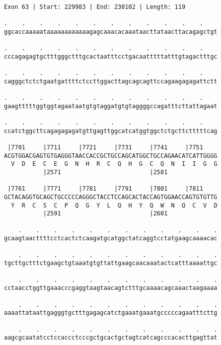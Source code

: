 \documentclass{article}
\begin{document}
\begin{Verbatim}[fontfamily=courier]
Exon 63 | Start: 229983 | End: 230102 | Length: 119

.    .    .    .    .    .    .    .    .    .    .    .    
ggcaccaaaaataaaaaaaaaaaagagcaaacacaaataacttataacttacagagctgt

.    .    .    .    .    .    .    .    .    .    .    .    
cccagagagtgctttgggctttgcactaatttcctgacaatttttatttgtagactttgc

.    .    .    .    .    .    .    .    .    .    .    .    
cagggctctctgaatgattttctccttggacttagcagcagttccagaagagagattctt

.    .    .    .    .    .    .    .    .    .    .    .    
gaagtttttggtggtagaataatgtgtaggatgtgtaggggccagatttcttattagaat

.    .    .    .    .    .    .    .    .    .    .    .    
ccatctggcttcagagagagatgttgagttggcatcatggtggctctgcttctttttcag

 |7701     |7711     |7721     |7731     |7741     |7751    
ACGTGGACGAGTGTGAGGGTAACCACCGCTGCCAGCATGGCTGCCAGAACATCATTGGGG
  V  D  E  C  E  G  N  H  R  C  Q  H  G  C  Q  N  I  I  G  G
           |2571                         |2581              

 |7761     |7771     |7781     |7791     |7801     |7811    
GCTACAGGTGCAGCTGCCCCCAGGGCTACCTCCAGCACTACCAGTGGAACCAGTGTGTTG
  Y  R  C  S  C  P  Q  G  Y  L  Q  H  Y  Q  W  N  Q  C  V  D
           |2591                         |2601              

    .    .    .    .    .    .    .    .    .    .    .    .
gcaagtaacttttcctcactctcaagatgcatggctatcaggtcctatgaagcaaaacac

    .    .    .    .    .    .    .    .    .    .    .    .
tgcttgctttctgaagctgtaaatgtgttattgaagcaacaaatactcatttaaaattgc

    .    .    .    .    .    .    .    .    .    .    .    .
cctaacctggttgaaacccgaggtaagtaacagtctttgcaaaacagcaaactaagaaaa

    .    .    .    .    .    .    .    .    .    .    .    .
aaaattataattgagggtgctttgagagcatctgaaatgaaatgcccccagaatttcttg

    .    .    .    .    .    .    .    .    .    .    .    .
aagcgcaatatcctccaccctcccgctgcactgctagtcatcagcccacacttgagttat
\end{Verbatim}
\newpage
\end{document}
